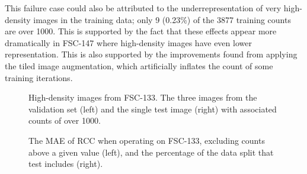 \documentclass[../thesis.tex]{subfiles}
\begin{document}
This failure case could also be attributed to the underrepresentation of very high-density images in the training data; only 9 (0.23\%) of the 3877 training counts are over 1000. 
This is supported by the fact that these effects appear more dramatically in FSC-147 where high-density images have even lower representation.
This is also supported by the improvements found from applying the tiled image augmentation, which artificially inflates the count of some training iterations.
\begin{table}
    \centering
    
    \caption{
    \textbf{The effect of removing high-density images from FSC-133.}
    Excluding the small number of very dense images significantly improves our results, showing that these are a weakness of our method.
    \# and \% denote the total number and percentage of images excluded respectively.
    }
    \label{table__LTCA__FSC147_exclusions_table}
\end{table}
\begin{figure}
    \centering
    
    \caption{High-density images from FSC-133. The three images from the validation set (left) and the single test image (right) with associated counts of over 1000. 
    }
    \label{fig__LTCA__FSC147_exclusions_figure}
\end{figure}



\begin{figure}
    \centering  
    \begin{subfigure}{0.49\linewidth}
        \centering
                
    \end{subfigure}
        \begin{subfigure}{0.49\linewidth}
        \centering
                
    \end{subfigure}
    \caption{The MAE of RCC when operating on FSC-133, excluding counts above a given value (left), and the percentage of the data split that test includes (right).}
    \label{fig__LTCA__FSC133_exclusion_graphs_non_cumulative}
\end{figure}
\end{document}
